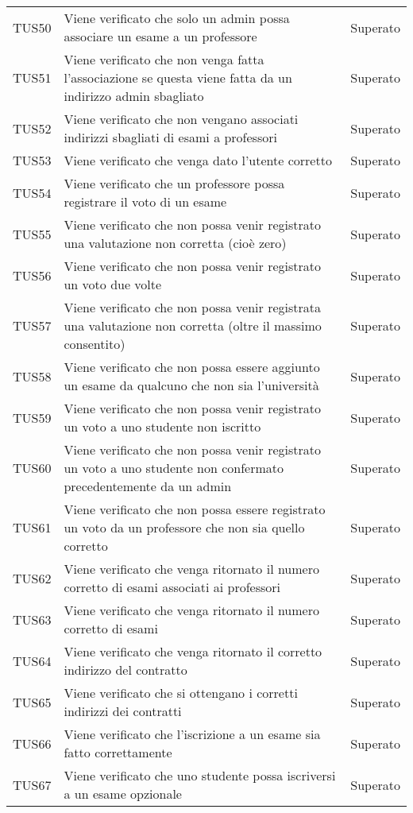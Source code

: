 \documentclass[PianoDiQualifica.tex]{subfiles}
\begin{document}
\begin{longtable}[H]{P{2cm}P{8.5cm}P{3cm}}
	TUS50 & Viene verificato che solo un admin possa associare un esame a un professore & Superato \\
	TUS51 & Viene verificato che non venga fatta l'associazione se questa viene fatta da un indirizzo admin sbagliato & Superato \\
	TUS52 & Viene verificato che non vengano associati indirizzi sbagliati di esami a professori & Superato \\
	TUS53 & Viene verificato che venga dato l'utente corretto & Superato \\
	TUS54 & Viene verificato che un professore possa registrare il voto di un esame & Superato \\
	TUS55 & Viene verificato che non possa venir registrato una valutazione non corretta (cioè zero) & Superato \\
	TUS56 & Viene verificato che non possa venir registrato un voto due volte & Superato \\
	TUS57 & Viene verificato che non possa venir registrata una valutazione non corretta (oltre il massimo consentito) & Superato \\
	TUS58 & Viene verificato che non possa essere aggiunto un esame da qualcuno che non sia l'università & Superato \\
	TUS59 & Viene verificato che non possa venir registrato un voto a uno studente non iscritto & Superato \\
	TUS60 & Viene verificato che non possa venir registrato un voto a uno studente non confermato precedentemente da un admin & Superato \\
	TUS61 & Viene verificato che non possa essere registrato un voto da un professore che non sia quello corretto & Superato \\
	TUS62 & Viene verificato che venga ritornato il numero corretto di esami associati ai professori & Superato \\
	TUS63 & Viene verificato che venga ritornato il numero corretto di esami & Superato \\
	TUS64 & Viene verificato che venga ritornato il corretto indirizzo del contratto & Superato \\
	TUS65 & Viene verificato che si ottengano i corretti indirizzi dei contratti & Superato \\
	TUS66 & Viene verificato che l'iscrizione a un esame sia fatto correttamente & Superato \\
	TUS67 & Viene verificato che uno studente possa iscriversi a un esame opzionale & Superato \\

\end{longtable}
\end{document}
